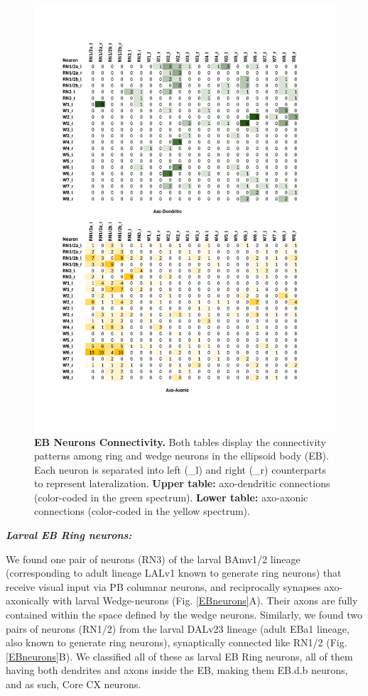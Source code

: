         \begin{figure}
            \centering
            \includegraphics[width=12cm]{Figs/CX/EBneuronsmatrix.pdf}
            \caption{\textbf{EB Neurons Connectivity.} Both tables display the connectivity patterns among ring and wedge neurons in the ellipsoid body (EB). Each neuron is separated into left (\_l) and right (\_r) counterparts to represent lateralization. \textbf{Upper table:} axo-dendritic connections (color-coded in the green spectrum). \textbf{Lower table:} axo-axonic connections (color-coded in the yellow spectrum).}
            \label{EBmatrix}
        \end{figure}



    \textbf{\textit{Larval EB Ring neurons:}}

    We found one pair of neurons (RN3) of the larval BAmv1/2 lineage (corresponding to adult lineage LALv1 known to generate ring neurons) that receive visual input via PB columnar neurons, and reciprocally synapses axo-axonically with larval Wedge-neurons (Fig. \ref{EBneurons}A).
    Their axons are fully contained within the space defined by the wedge neurons.
    Similarly, we found two pairs of neurons (RN1/2) from the larval DALv23 lineage (adult EBa1 lineage, also known to generate ring neurons), synaptically connected like RN1/2 (Fig. \ref{EBneurons}B). We classified all of these as larval EB Ring neurons, all of them having both dendrites and axons inside the EB, making them EB.d.b neurons, and as such, Core CX neurons. 

